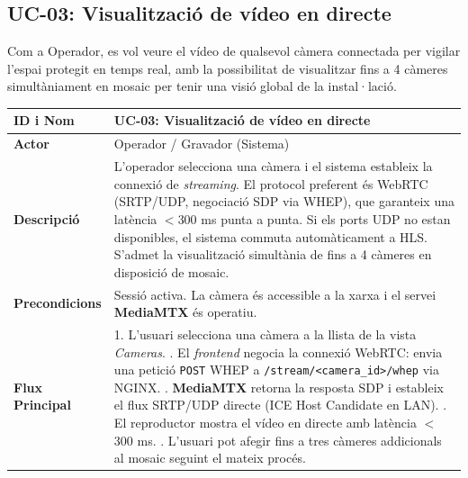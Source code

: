\clearpage
\subsection{UC-03: Visualització de vídeo en directe}
Com a Operador, es vol veure el vídeo de qualsevol càmera connectada per vigilar l'espai protegit en temps real, amb la possibilitat de visualitzar fins a 4 càmeres simultàniament en mosaic per tenir una visió global de la instal·lació.

\begin{table}[htbp]
  \centering
  \small
  \begin{tabular}{|l|p{10cm}|}
    \hline
    \rowcolor{backcolour} \textbf{ID i Nom} & \textbf{UC-03: Visualització de vídeo en directe}                                                                              \\ \hline
    \textbf{Actor}                          & Operador / Gravador (Sistema)                                                                                                  \\ \hline
    \textbf{Descripció}                     & L'operador selecciona una càmera i el sistema estableix la connexió de \textit{streaming}. El protocol preferent és WebRTC (SRTP/UDP, negociació SDP via WHEP), que garanteix una latència $<$300 ms punta a punta. Si els ports UDP no estan disponibles, el sistema commuta automàticament a HLS. S'admet la visualització simultània de fins a 4 càmeres en disposició de mosaic.   \\ \hline
    \textbf{Precondicions}                  & Sessió activa. La càmera és accessible a la xarxa i el servei \textbf{MediaMTX} és operatiu.                                  \\ \hline
    \textbf{Flux Principal}                 &
    1. L'usuari selecciona una càmera a la llista de la vista \textit{Cameras}. \newline
    2. El \textit{frontend} negocia la connexió WebRTC: envia una petició \texttt{POST} WHEP a \texttt{/stream/<camera\_id>/whep} via NGINX. \newline
    3. \textbf{MediaMTX} retorna la resposta SDP i estableix el flux SRTP/UDP directe (ICE Host Candidate en LAN). \newline
    4. El reproductor mostra el vídeo en directe amb latència $<$300 ms. \newline
    5. L'usuari pot afegir fins a tres càmeres addicionals al mosaic seguint el mateix procés.                                   \\ \hline

\end{tabular}
\end{table}
